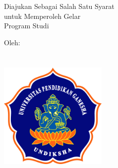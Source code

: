 \begin{titlepage}
  \begin{center}
    \fontsize{14pt}{16.8pt}\selectfont\MakeUppercase{\bo{\judul}}\\
      \vspace{1.5cm}
      \fontsize{16pt}{19.2pt}\selectfont\MakeUppercase{\bo{\tipe}}\\
      \vspace{1.5cm}
      \fontsize{11pt}{13.2pt}\selectfont Diajukan Sebagai Salah Satu Syarat\\
      untuk Memperoleh Gelar \gelar \space {}\\
      Program Studi \prodi\\
      \vspace{1.5cm}

      \fontsize{13.5pt}{16.2pt}\selectfont Oleh:\\
      \vspace{1.0cm}
      \MakeUppercase{\bo{\underline{\peneliti}}}\\
      \MakeUppercase{\bo{\nim}}\\
     

     \vfill
     \includegraphics[width=5.2cm, height=5.2cm]{konten/Hal_Depan/gambar/logo-undiksha.png}
     \vfill

       \fontsize{13.5pt}{16.2pt}\selectfont\MakeUppercase{\bo{\fakultas}}\\
       \MakeUppercase{\bo{\universitas}}\\
       \MakeUppercase{\bo{\kota}}\\
       \bo{\tahun}\\
  \end{center}
\end{titlepage}